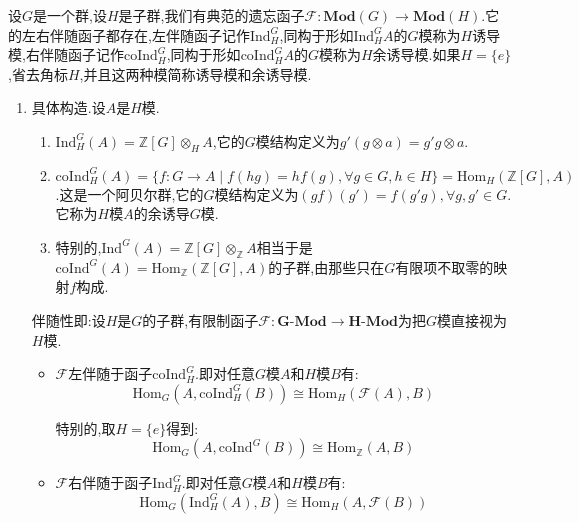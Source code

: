 设$G$是一个群,设$H$是子群,我们有典范的遗忘函子$\mathscr{F}:\textbf{Mod}(G)\to\textbf{Mod}(H)$.它的左右伴随函子都存在,左伴随函子记作$\mathrm{Ind}_H^G$,同构于形如$\mathrm{Ind}_H^GA$的$G$模称为$H$诱导模,右伴随函子记作$\mathrm{coInd}_H^G$,同构于形如$\mathrm{coInd}_H^GA$的$G$模称为$H$余诱导模.如果$H=\{e\}$,省去角标$H$,并且这两种模简称诱导模和余诱导模.
\begin{enumerate}
	\item 具体构造.设$A$是$H$模.
	\begin{enumerate}[(1)]
		\item $\mathrm{Ind}_H^G(A)=\mathbb{Z}[G]\otimes_HA$,它的$G$模结构定义为$g'(g\otimes a)=g'g\otimes a$.
		\item $\mathrm{coInd}_H^G(A)=\{f:G\to A\mid f(hg)=hf(g),\forall g\in G,h\in H\}=\mathrm{Hom}_H(\mathbb{Z}[G],A)$.这是一个阿贝尔群,它的$G$模结构定义为$(gf)(g')=f(g'g),\forall g,g'\in G$.它称为$H$模$A$的余诱导$G$模.
		\item 特别的,$\mathrm{Ind}^G(A)=\mathbb{Z}[G]\otimes_{\mathbb{Z}}A$相当于是$\mathrm{coInd}^G(A)=\mathrm{Hom}_{\mathbb{Z}}(\mathbb{Z}[G],A)$的子群,由那些只在$G$有限项不取零的映射$f$构成.
	\end{enumerate}
	
	伴随性即:设$H$是$G$的子群,有限制函子$\mathscr{F}:\textbf{G-Mod}\to\textbf{H-Mod}$为把$G$模直接视为$H$模.
	\begin{itemize}
		\item $\mathscr{F}$左伴随于函子$\mathrm{coInd}^G_H$.即对任意$G$模$A$和$H$模$B$有:
		$$\mathrm{Hom}_G(A,\mathrm{coInd}^G_H(B))\cong\mathrm{Hom}_H(\mathscr{F}(A),B)$$
		
		特别的,取$H=\{e\}$得到:
		$$\mathrm{Hom}_G(A,\mathrm{coInd}^G(B))\cong\mathrm{Hom}_{\mathbb{Z}}(A,B)$$
		\item $\mathscr{F}$右伴随于函子$\mathrm{Ind}^G_H$.即对任意$G$模$A$和$H$模$B$有:
		$$\mathrm{Hom}_G(\mathrm{Ind}^G_H(A),B)\cong\mathrm{Hom}_H(A,\mathscr{F}(B))$$
		

\end{itemize}
\end{enumerate}
